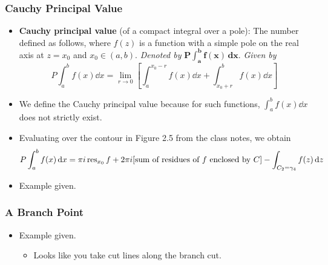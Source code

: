 \documentclass[../finalProject.tex]{subfiles}
\begin{document}
\subsubsection{Cauchy Principal Value}
\begin{itemize}
    \item \textbf{Cauchy principal value} (of a compact integral over a pole): The number defined as follows, where $f(z)$ is a function with a simple pole on the real axis at $z=x_0$ and $x_0\in(a,b)$. \emph{Denoted by} $\bm{P\int_a^bf(x)\,\textbf{d}x}$. \emph{Given by}
    \begin{equation*}
        P\int_a^bf(x)\dd{x} = \lim_{r\to 0}\left[ \int_a^{x_0-r}f(x)\dd{x}+\int_{x_0+r}^bf(x)\dd{x} \right]
    \end{equation*}
    \item We define the Cauchy principal value because for such functions, $\int_a^bf(x)\dd{x}$ does not strictly exist.
    \item Evaluating over the contour in Figure 2.5 from the class notes, we obtain
    \begin{equation*}
        P\int_a^bf(x)\dd{x} = \pi i\operatorname{res}_{x_0}f+2\pi i[\text{sum of residues of }f\text{ enclosed by }C]-\int_{C_2=\gamma_4}f(z)\dd{z}
    \end{equation*}
    \item Example given.
\end{itemize}

\subsubsection{A Branch Point}
\begin{itemize}
    \item Example given.
    \begin{itemize}
        \item Looks like you take cut lines along the branch cut.
    \end{itemize}
\end{itemize}
\end{document}
